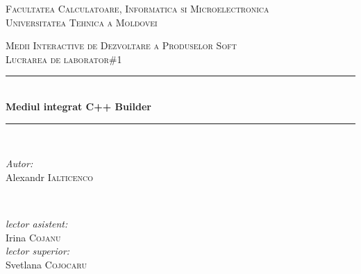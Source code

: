 \documentclass[12pt]{article}
\begin{document}
\begin{titlepage}
\begin{center} 
 \textsc{\large Facultatea Calculatoare, Informatica si Microelectronica}\\[0.5cm]
\textsc{\large Universitatea Tehnica a Moldovei}\\[1.2cm] 
\vspace{25 mm}

\textsc{\Large Medii Interactive de Dezvoltare a Produselor Soft}\\[0.5cm] 
\textsc{\large Lucrarea de laborator\#1}\\[0.5cm] \newcommand{\HRule}{\rule{\linewidth}{0.5mm}} 
  \vspace{10 mm}
  \HRule \\[0.4cm]
  { \LARGE \bfseries Mediul integrat C++ Builder  }\\[0.4cm] 
  \HRule \\[1.5cm]
      \vspace{30mm}

      \begin{minipage}{0.4\textwidth}
      \begin{flushleft} \large
      \emph{Autor:}\\
      Alexandr \textsc{Ialticenco}
      \end{flushleft}
      \end{minipage}
      ~
      \begin{minipage}{0.4\textwidth}
      \begin{flushright} \large
      \emph{lector asistent:} \\
      Irina \textsc{Cojanu} \\ 
      \emph{lector superior:} \\
      Svetlana \textsc{Cojocaru} 
      \end{flushright}
      \end{minipage}\\[4cm]

      \vspace{5 mm}

      \vfill
      \end{center}
      
\end{titlepage}
\end{document}
